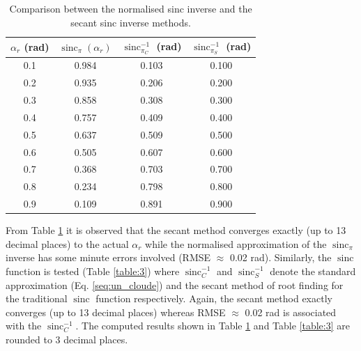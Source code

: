 \documentclass[12pt]{elsarticle}
\numberwithin{equation}{section}
\numberwithin{figure}{section}
\numberwithin{table}{section}
\DeclareMathOperator{\sinc}{sinc}
\begin{document}
\begin{table}[ht]
\centering
\caption{Comparison between the normalised \cite{Cloude2010} sinc inverse and the secant sinc inverse methods.}
\label{table:2}
\begin{tabular}{c c c c}
\hline
\boldmath$\alpha_r$ \textbf{(rad)} & \boldmath$\sinc_{\pi}\left(\alpha_r\right)$   & \boldmath$\sinc_{\pi_C}^{-1}$ \textbf{(rad)}     & \boldmath$\sinc_{\pi_S}^{-1}$ \textbf{(rad)} \\ \hline
0.1                 & 0.984            & 0.103          & 0.100  \\ 
0.2                 & 0.935            & 0.206          & 0.200  \\ 
0.3                 & 0.858            & 0.308          & 0.300  \\ 
0.4                 & 0.757            & 0.409          & 0.400  \\ 
0.5                 & 0.637            & 0.509          & 0.500   \\ 
0.6                 & 0.505            & 0.607          & 0.600  \\ 
0.7                 & 0.368            & 0.703          & 0.700   \\ 
0.8                 & 0.234            & 0.798          & 0.800 \\ 
0.9                 & 0.109            & 0.891          & 0.900 \\ \hline

\end{tabular}
\end{table}

From Table \ref{table:2} it is observed that the secant method converges exactly (up to 13 decimal places) to the
actual $\alpha_r$ while the normalised \cite{Cloude2010} approximation of the $\sinc_\pi$ inverse has some minute errors
involved (RMSE $\approx$ 0.02 rad). Similarly, the $\sinc$ function is tested (Table \ref{table:3}) where $\sinc_C^{-1}$ and $\sinc_S^{-1}$ denote the standard \cite{Cloude2010} approximation (Eq. \eqref{seq:un_cloude}) and the secant method of root finding for the traditional $\sinc$ function respectively. Again, the secant method exactly converges (up to 13 decimal places) whereas RMSE $\approx$ 0.02 rad is associated with the $\sinc_C^{-1}$. The computed results shown in Table \ref{table:2} and Table \ref{table:3} are rounded to 3 decimal places.
\end{document}
